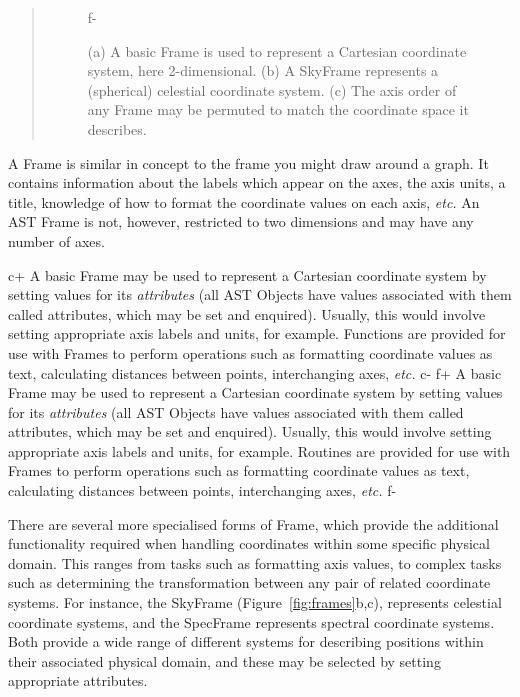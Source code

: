 \documentclass[twoside,11pt]{article}
\begin{document}
\begin{htmlonly}
\begin{quote}
\begin{figure}
f-
   \caption{(a) A basic Frame is used to represent a Cartesian coordinate
   system, here 2-dimensional. (b) A SkyFrame represents a (spherical)
   celestial coordinate system. (c) The axis order of any Frame may be
   permuted to match the coordinate space it describes.}
   \end{figure}
   \end{quote}
\end{htmlonly}
A Frame is similar in concept to the frame you might draw around a
graph.  It contains information about the labels which appear on the
axes, the axis units, a title, knowledge of how to format the
coordinate values on each axis, {\em{etc.}}  An AST Frame is not,
however, restricted to two dimensions and may have any number of axes.

c+
A basic Frame may be used to represent a Cartesian coordinate system
by setting values for its {\em attributes} (all AST Objects have
values associated with them called attributes, which may be set and
enquired).  Usually, this would involve setting appropriate axis
labels and units, for example.  Functions are provided for use with
Frames to perform operations such as formatting coordinate values as
text, calculating distances between points, interchanging axes,
{\em{etc.}}
c-
f+
A basic Frame may be used to represent a Cartesian coordinate system
by setting values for its {\em attributes} (all AST Objects have
values associated with them called attributes, which may be set and
enquired).  Usually, this would involve setting appropriate axis
labels and units, for example.  Routines are provided for use with
Frames to perform operations such as formatting coordinate values as
text, calculating distances between points, interchanging axes,
{\em{etc.}}
f-

There are several more specialised forms of Frame, which provide the
additional functionality required when handling coordinates within some
specific physical domain. This ranges from tasks such as formatting axis
values, to complex tasks such as determining the transformation between
any pair of related coordinate systems. For instance, the SkyFrame
(Figure~\ref{fig:frames}b,c), represents celestial coordinate systems,
and the SpecFrame represents spectral coordinate systems. Both provide a
wide range of different systems for describing positions within their
associated physical domain, and these may be selected by setting appropriate 
attributes.  
\end{document}
